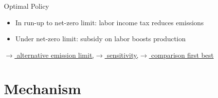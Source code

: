 \documentclass[11pt,aspectratio=169]{beamer}
\begin{document}
\begin{frame}{Optimal Policy}
\begin{figure}[h!!]
\begin{subfigure}{0.4\textwidth}
	\end{subfigure}
\end{figure}
\vspace{5mm}
\begin{block}{}
	\begin{itemize}
		\item In run-up to net-zero limit: labor income tax reduces emissions
		\item Under net-zero limit: subsidy on labor boosts production
	\end{itemize}
\end{block}	


\hypertarget{backOPT}{}
\vspace{-4mm}
\hfill
\hyperlink{altems}{\tiny{$\rightarrow$ alternative emission limit,}}\hyperlink{sensphi}{\tiny{$\rightarrow$ sensitivity,}}\hyperlink{compfb}{\tiny{$\rightarrow$ comparison first best}}
\end{frame}


\section*{Mechanism}
\end{document}
